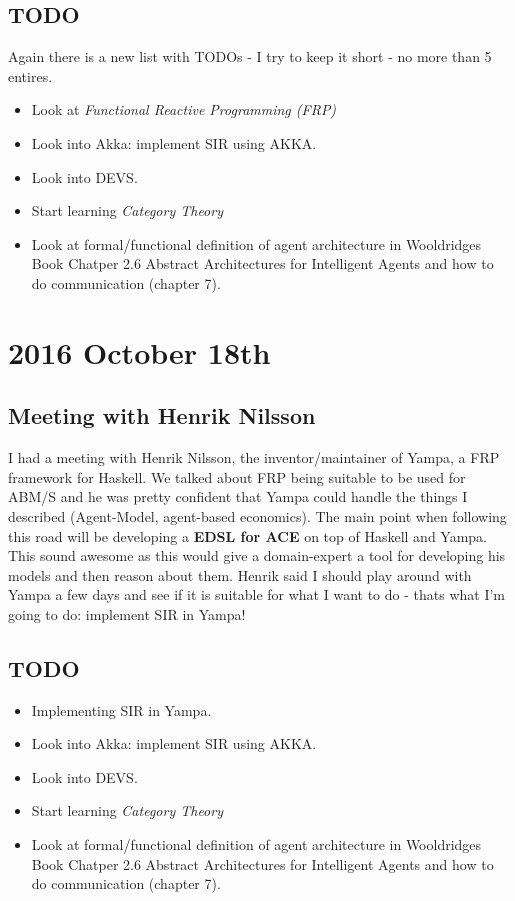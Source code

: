 \subsection*{TODO}
Again there is a new list with TODOs - I try to keep it short - no more than 5 entires.
\begin{itemize}
\item Look at \textit{Functional Reactive Programming (FRP)}
\item Look into Akka: implement SIR using AKKA.
\item Look into DEVS.
\item Start learning \textit{Category Theory}
\item Look at formal/functional definition of agent architecture in Wooldridges Book Chatper 2.6 Abstract Architectures for Intelligent Agents and how to do communication (chapter 7).
\end{itemize}

\section*{2016 October 18th}
\subsection*{Meeting with Henrik Nilsson}
I had a meeting with Henrik Nilsson, the inventor/maintainer of Yampa, a FRP framework for Haskell. We talked about FRP being suitable to be used for ABM/S and he was pretty confident that Yampa could handle the things I described (Agent-Model, agent-based economics). The main point when following this road will be developing a \textbf{EDSL for ACE} on top of Haskell and Yampa. This sound awesome as this would give a domain-expert a tool for developing his models and then reason about them. Henrik said I should play around with Yampa a few days and see if it is suitable for what I want to do - thats what I'm going to do: implement SIR in Yampa!

\subsection*{TODO}
\begin{itemize}
\item Implementing SIR in Yampa.
\item Look into Akka: implement SIR using AKKA.
\item Look into DEVS.
\item Start learning \textit{Category Theory}
\item Look at formal/functional definition of agent architecture in Wooldridges Book Chatper 2.6 Abstract Architectures for Intelligent Agents and how to do communication (chapter 7).
 \end{itemize}
 
